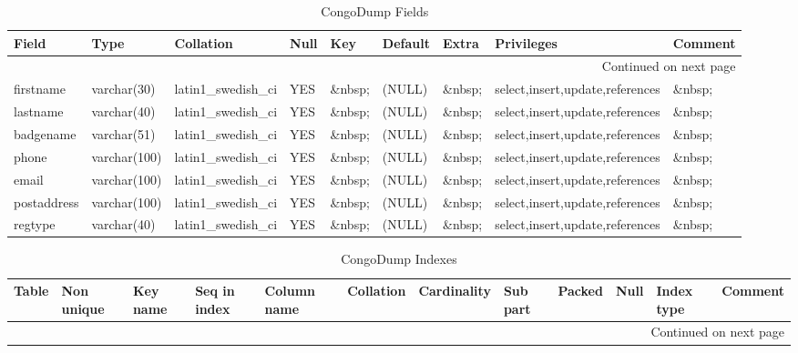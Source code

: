 \documentclass[tablesignature,landscape]{scrartcl}
\begin{document}
\begin{longtable}{|l|l|l|l|l|l|l|l|l|}
\caption{CongoDump Fields} \label{tbl:congodumpfields}\\
\hline
 Field        &  Type          &  Collation                &  Null     &  Key      &  Default  &  Extra    &  Privileges                       &  Comment \\
\hline
\endhead
\hline\multicolumn{9}{r}{Continued on next page}\
\endfoot
\endlastfoot
\hline
 badgeid      &  varchar(15)   &  latin1\_{}swedish\_{}ci  &  \&nbsp;  &  PRI      &  \&nbsp;  &  \&nbsp;  &  select,insert,update,references  &  \&nbsp;  \\
 firstname    &  varchar(30)   &  latin1\_{}swedish\_{}ci  &  YES      &  \&nbsp;  &  (NULL)   &  \&nbsp;  &  select,insert,update,references  &  \&nbsp;  \\
 lastname     &  varchar(40)   &  latin1\_{}swedish\_{}ci  &  YES      &  \&nbsp;  &  (NULL)   &  \&nbsp;  &  select,insert,update,references  &  \&nbsp;  \\
 badgename    &  varchar(51)   &  latin1\_{}swedish\_{}ci  &  YES      &  \&nbsp;  &  (NULL)   &  \&nbsp;  &  select,insert,update,references  &  \&nbsp;  \\
 phone        &  varchar(100)  &  latin1\_{}swedish\_{}ci  &  YES      &  \&nbsp;  &  (NULL)   &  \&nbsp;  &  select,insert,update,references  &  \&nbsp;  \\
 email        &  varchar(100)  &  latin1\_{}swedish\_{}ci  &  YES      &  \&nbsp;  &  (NULL)   &  \&nbsp;  &  select,insert,update,references  &  \&nbsp;  \\
 postaddress  &  varchar(100)  &  latin1\_{}swedish\_{}ci  &  YES      &  \&nbsp;  &  (NULL)   &  \&nbsp;  &  select,insert,update,references  &  \&nbsp;  \\
 regtype      &  varchar(40)   &  latin1\_{}swedish\_{}ci  &  YES      &  \&nbsp;  &  (NULL)   &  \&nbsp;  &  select,insert,update,references  &  \&nbsp;  \\
\hline
\end{longtable}


\begin{longtable}{|l|l|l|l|l|l|l|l|l|l|l|l|}
\caption{CongoDump Indexes} \label{tbl:congodumpindexes}\\
\hline
 Table      &  Non unique  &  Key name  &  Seq in index  &  Column name  &  Collation  &  Cardinality  &  Sub part  &  Packed  &  Null     &  Index type  &  Comment \\
\hline
\endhead
\hline\multicolumn{12}{r}{Continued on next page}\
\endfoot
\endlastfoot
\hline
 CongoDump  &           0  &  PRIMARY   &             1  &  badgeid      &  A          &            2  &  (NULL)    &  (NULL)  &  \&nbsp;  &  BTREE       &  \&nbsp;  \\
\hline
\end{longtable}
\end{document}
